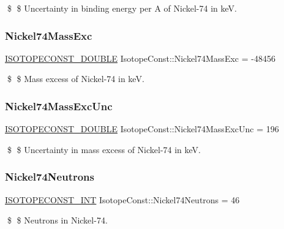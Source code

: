 \$ \$ Uncertainty in binding energy per A of Nickel-\/74 in keV. \mbox{\label{group___isotope_const-_nickel-_ni74_ga56af92e276404a6e2bbf886ee0fe6b2e}} 
\subsubsection{\texorpdfstring{Nickel74\+Mass\+Exc}{Nickel74MassExc}}
{\footnotesize\ttfamily \mbox{\hyperlink{group___isotope_const-_macros_ga8f45a7272ce02c0b4c65c44636ed719a}{I\+S\+O\+T\+O\+P\+E\+C\+O\+N\+S\+T\+\_\+\+D\+O\+U\+B\+LE}} Isotope\+Const\+::\+Nickel74\+Mass\+Exc = -\/48456}

\$ \$ Mass excess of Nickel-\/74 in keV. \mbox{\label{group___isotope_const-_nickel-_ni74_gabce867ccf35e4100c03dde3dd414601d}} 
\subsubsection{\texorpdfstring{Nickel74\+Mass\+Exc\+Unc}{Nickel74MassExcUnc}}
{\footnotesize\ttfamily \mbox{\hyperlink{group___isotope_const-_macros_ga8f45a7272ce02c0b4c65c44636ed719a}{I\+S\+O\+T\+O\+P\+E\+C\+O\+N\+S\+T\+\_\+\+D\+O\+U\+B\+LE}} Isotope\+Const\+::\+Nickel74\+Mass\+Exc\+Unc = 196}

\$ \$ Uncertainty in mass excess of Nickel-\/74 in keV. \mbox{\label{group___isotope_const-_nickel-_ni74_gae3cc2bb7573ea7a2e013c6108cf2fb49}} 
\subsubsection{\texorpdfstring{Nickel74\+Neutrons}{Nickel74Neutrons}}
{\footnotesize\ttfamily \mbox{\hyperlink{group___isotope_const-_macros_ga5f18360b3e99483a35c32d789e62621c}{I\+S\+O\+T\+O\+P\+E\+C\+O\+N\+S\+T\+\_\+\+I\+NT}} Isotope\+Const\+::\+Nickel74\+Neutrons = 46}

\$ \$ Neutrons in Nickel-\/74. \mbox{\label{group___isotope_const-_nickel-_ni74_gaa306636d672384463be8e89789e1e07f}} 

